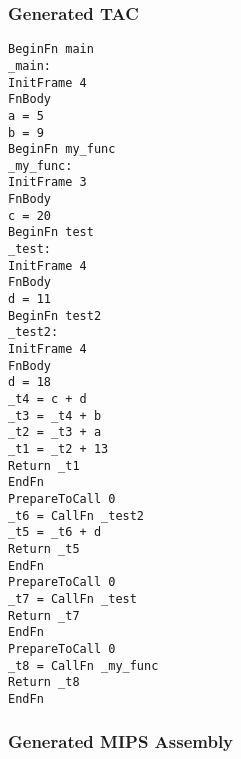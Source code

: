 \subsubsection{Generated TAC}
\begin{lstlisting}[showstringspaces=false,breaklines=true,backgroundcolor=\color{light-gray}, captionpos=b]
BeginFn main
_main:
InitFrame 4
FnBody
a = 5
b = 9
BeginFn my_func
_my_func:
InitFrame 3
FnBody
c = 20
BeginFn test
_test:
InitFrame 4
FnBody
d = 11
BeginFn test2
_test2:
InitFrame 4
FnBody
d = 18
_t4 = c + d
_t3 = _t4 + b
_t2 = _t3 + a
_t1 = _t2 + 13
Return _t1
EndFn
PrepareToCall 0
_t6 = CallFn _test2
_t5 = _t6 + d
Return _t5
EndFn
PrepareToCall 0
_t7 = CallFn _test
Return _t7
EndFn
PrepareToCall 0
_t8 = CallFn _my_func
Return _t8
EndFn

\end{lstlisting}\subsubsection{Generated MIPS Assembly}
